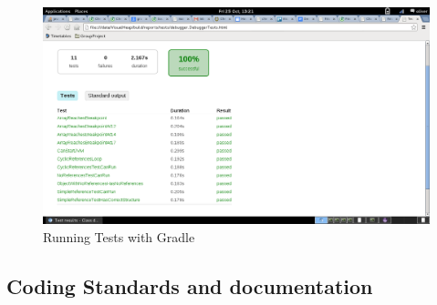 \documentclass[10pt, a4paper]{article}
\begin{document}
\begin{figure}[h]
	\centering
	\includegraphics[width=\textwidth]{images/testresults.png}
	\caption{Running Tests with Gradle}
\end{figure}

\subsection{Coding Standards and documentation}
\end{document}

